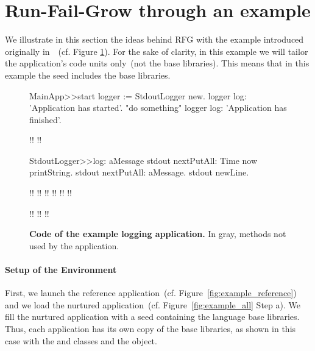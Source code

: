 

\section{Run-Fail-Grow through an example}\label{sec:rfg_example}
We illustrate in this section the ideas behind RFG with the example introduced originally in~~(cf. Figure \ref{fig:code_example_again}). For the sake of clarity, in this example we will tailor the application's code units only~(\ie not the base libraries). This means that in this example the seed includes the base libraries.

\begin{figure}[ht]
\begin{code}
MainApp>>start
    logger := StdoutLogger new.
    logger log: 'Application has started'.
    "do something"
    logger log: 'Application has finished'.

!!
!!

StdoutLogger>>log: aMessage
    stdout nextPutAll: Time now printString.
    stdout nextPutAll: aMessage.
    stdout newLine.
    
!!
!!
!!
!!
!!
!!

!!
!!
!!
\end{code}

\caption{ \small\textbf{Code of the example logging application.} In gray, methods not used by the application.\label{fig:code_example_again}}
\end{figure}


\paragraph{Setup of the Environment} First, we launch the reference application~(cf. Figure~\ref{fig:example_reference}) and we load the nurtured application~(cf. Figure~\ref{fig:example_all} Step a). We fill the nurtured application with a seed containing the language base libraries. Thus, each application has its own copy of the base libraries, as shown in this case with the  and  classes and the  object.

